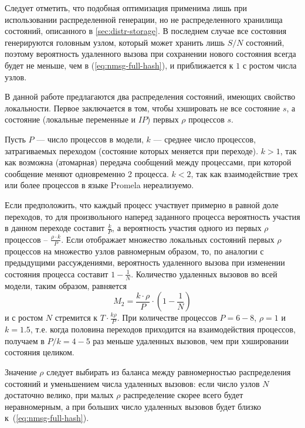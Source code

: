 Следует отметить, что подобная оптимизация применима лишь при использовании распределенной
генерации, но не распределенного хранилища состояний, описанного в
\ref{sec:distr-storage}. В последнем случае все состояния генерируются головным узлом,
который может хранить лишь $S/N$ состояний, поэтому вероятность удаленного вызова при
сохранении нового состояния всегда будет не меньше, чем в (\ref{eq:nmsg-full-hash}), и
приближается к $1$ с ростом числа узлов.

В данной работе предлагаются два распределения состояний, имеющих свойство
локальности. Первое заключается в том, чтобы хэшировать не все состояние $s$, а состояние
(локальные переменные и $IP$) первых $\rho$ процессов $s$.

Пусть $P$ — число процессов в модели, $k$ — среднее число процессов, затрагиваемых
переходом (состояние которых меняется при переходе). $k > 1$, так как возможна (атомарная)
передача сообщений между процессами, при которой сообщение меняют одновременно 2
процесса. $k < 2$, так как взаимодействие трех или более процессов в языке Promela
нереализуемо.

Если предположить, что каждый процесс участвует примерно в равной доле переходов, то для
произвольного наперед заданного процесса вероятность участия в данном переходе составит
$\frac{k}{P}$, а вероятность участия одного из первых $\rho$ процессов -- $\frac{\rho\cdot
  k}{P}$. Если  отображает множество локальных состояний первых $\rho$
процессов на множество узлов равномерным образом, то, по аналогии с предыдущими
рассуждениями, вероятность удаленного вызова при изменении состояния процесса составит $1
- \frac{1}{N}$. Количество удаленных вызовов во всей модели, таким образом, равняется
\begin{equation}
  \label{eq:nmsg-firstproc-hash}
  M_2 = \frac{k\cdot\rho}{P} \cdot (1 - \frac{1}{N})
\end{equation}
и с ростом $N$ стремится к $T \cdot \frac{k\rho}{P}$. При количестве процессов $P = 6-8$,
$\rho = 1$ и $k = 1.5$, т.е. когда половина переходов приходится на взаимодействия
процессов, получаем в $P/k = 4-5$ раз меньше удаленных вызовов, чем при хэшировании
состояния целиком.

Значение $\rho$ следует выбирать из баланса между равномерностью распределения состояний и
уменьшением числа удаленных вызовов: если число узлов $N$ достаточно велико, при малых
$\rho$ распределение скорее всего будет неравномерным, а при больших число удаленных
вызовов будет близко к~(\ref{eq:nmsg-full-hash}).

